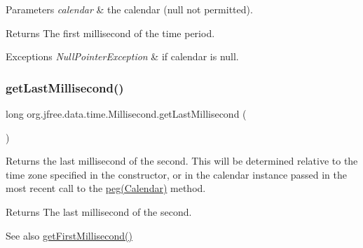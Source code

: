 \begin{DoxyParams}{Parameters}
{\em calendar} & the calendar ({\ttfamily null} not permitted).\\
\hline
\end{DoxyParams}
\begin{DoxyReturn}{Returns}
The first millisecond of the time period.
\end{DoxyReturn}

\begin{DoxyExceptions}{Exceptions}
{\em Null\+Pointer\+Exception} & if {\ttfamily calendar} is {\ttfamily null}. \\
\hline
\end{DoxyExceptions}
\mbox{\label{classorg_1_1jfree_1_1data_1_1time_1_1_millisecond_ac9a80b0e4405e3fdedf5bd1ba4f3460a}} 
\subsubsection{\texorpdfstring{get\+Last\+Millisecond()}{getLastMillisecond()}\hspace{0.1cm}{\footnotesize\ttfamily [1/2]}}
{\footnotesize\ttfamily long org.\+jfree.\+data.\+time.\+Millisecond.\+get\+Last\+Millisecond (\begin{DoxyParamCaption}{ }\end{DoxyParamCaption})}

Returns the last millisecond of the second. This will be determined relative to the time zone specified in the constructor, or in the calendar instance passed in the most recent call to the \mbox{\hyperlink{classorg_1_1jfree_1_1data_1_1time_1_1_millisecond_ae9a69e2252d3319a76b4592798b9b1aa}{peg(\+Calendar)}} method.

\begin{DoxyReturn}{Returns}
The last millisecond of the second.
\end{DoxyReturn}
\begin{DoxySeeAlso}{See also}
\mbox{\hyperlink{classorg_1_1jfree_1_1data_1_1time_1_1_millisecond_a1911c22a597714f32bf790aa1f358950}{get\+First\+Millisecond()}} 
\end{DoxySeeAlso}
\mbox{\label{classorg_1_1jfree_1_1data_1_1time_1_1_millisecond_ae7520d5a56fccdde166dfa162a0ff9e7}} 
